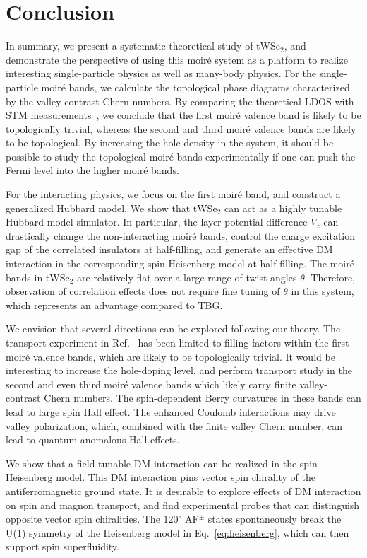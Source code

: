 \documentclass[aps,prx,floatfix,twocolumn]{revtex4-1}
\begin{document}
     
	
	\section{Conclusion}\label{sec:conclusion}
	In summary, we present a systematic theoretical study of tWSe$_2$, and demonstrate the perspective of using this moir\'e system as a platform to realize interesting single-particle physics as well as many-body physics. For the single-particle moir\'e bands, we calculate the topological phase diagrams characterized by the valley-contrast Chern numbers. By comparing the theoretical LDOS with STM measurements~\cite{zhang2020flat}, we conclude that the first moir\'e valence band is likely to be topologically trivial, whereas the second and third moir\'e valence bands are likely to be topological. By increasing the hole density in the system, it should be possible to study the topological moir\'e bands experimentally if one can push the Fermi level into the higher moir\'e bands.
	
	For the interacting physics, we focus on the first moir\'e band, and construct a generalized Hubbard model. We show that tWSe$_2$ can act as a highly tunable Hubbard model simulator. In particular, the layer potential difference $V_z$ can drastically change the non-interacting moir\'e bands, control the charge excitation gap of the correlated insulators at half-filling, and generate an effective DM interaction in the corresponding spin Heisenberg model at half-filling. The moir\'e bands in tWSe$_2$ are relatively flat over a large range of twist angles $\theta$. Therefore, observation of correlation effects does not require fine tuning of $\theta$ in this system, which represents an advantage compared to TBG. 
	
	We envision that several directions can be explored following our theory. The transport experiment in Ref.~\cite{wang2019magic} has been limited to filling factors within the first moir\'e valence bands, which are likely to be topologically trivial. It would be interesting to increase the hole-doping level, and perform transport study in the second and even third moir\'e valence bands which likely carry finite valley-contrast Chern numbers. The spin-dependent Berry curvatures in these bands can lead to large spin Hall effect. The  enhanced Coulomb interactions may drive valley polarization, which, combined with the finite valley Chern number, can lead to quantum anomalous Hall effects. 
	
	We show that a field-tunable DM interaction can be realized in the spin Heisenberg model. This DM interaction pins vector spin chirality of the antiferromagnetic ground state. It is desirable to explore effects of DM interaction on spin and magnon transport, and find experimental probes that can distinguish opposite  vector spin chiralities. The 120$^{\circ}$ AF$^{\pm}$ states spontaneously break the U(1) symmetry of the Heisenberg model in Eq.~\eqref{eq:heisenberg}, which can then support spin superfluidity.
	
\end{document}
